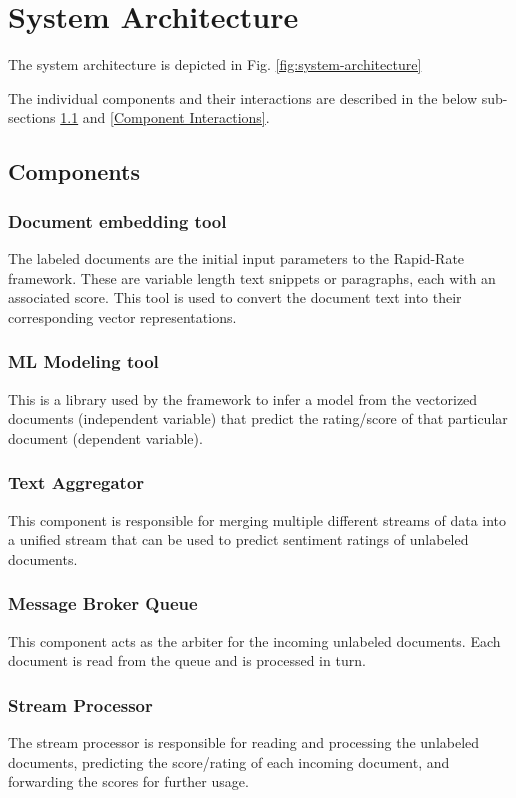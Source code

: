 \documentclass[conference]{IEEEtran}
\begin{document}
\section{System Architecture}
The system architecture is depicted in Fig. \ref{fig:system-architecture}

The individual components and their interactions are described in the below sub-sections \ref{Components} and \ref{Component Interactions}.

\subsection{Components} \label{Components}

\subsubsection{Document embedding tool}
The labeled documents are the initial input parameters to the Rapid-Rate framework. These are variable length text snippets or paragraphs, each with an associated score. This tool is used to convert the document text into their corresponding vector representations.

\subsubsection{ML Modeling tool}
This is a library used by the framework to infer a model from the vectorized documents (independent variable) that predict the rating/score of that particular document (dependent variable). 

\subsubsection{Text Aggregator}
This component is responsible for merging multiple different streams of data into a unified stream that can be used to predict sentiment ratings of unlabeled documents.

\subsubsection{Message Broker Queue}
This component acts as the arbiter for the incoming unlabeled documents. 
Each document is read from the queue and is processed in turn.

\subsubsection{Stream Processor}
The stream processor is responsible for reading and processing the unlabeled documents, predicting the score/rating of each incoming document, and forwarding the scores for further usage.
\end{document}
